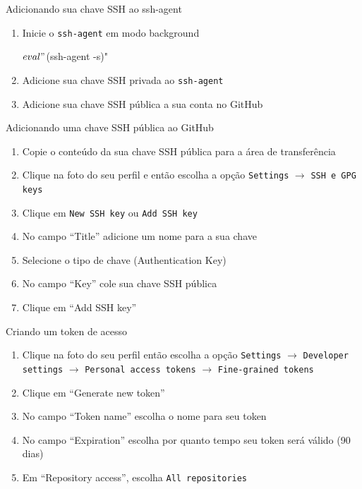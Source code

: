 \documentclass[aspectratio=169,14pt]{beamer}
\begin{document}
\begin{frame}[fragile]{Adicionando sua chave SSH ao ssh-agent}
    \begin{enumerate}
        \item Inicie o \texttt{ssh-agent} em modo background
        \begin{bashcode}
            $ eval "$(ssh-agent -s)"
        \end{bashcode}
        \item Adicione sua chave SSH privada ao \texttt{ssh-agent}
        \item Adicione sua chave SSH pública a sua conta no GitHub
    \end{enumerate}
\end{frame}

\begin{frame}{Adicionando uma chave SSH pública ao GitHub}
    \begin{enumerate}
        \item Copie o conteúdo da sua chave SSH pública para a área de
        transferência
        \item Clique na foto do seu perfil e então escolha a opção
        \texttt{Settings} $\rightarrow$ \texttt{SSH e GPG keys}
        \item Clique em \texttt{New SSH key} ou \texttt{Add SSH key}
        \item No campo ``Title'' adicione um nome para a sua chave
        \item Selecione o tipo de chave (Authentication Key)
        \item No campo ``Key'' cole sua chave SSH pública
        \item Clique em ``Add SSH key''
    \end{enumerate}
\end{frame}

\begin{frame}{Criando um token de acesso}
    \begin{enumerate}
        \item Clique na foto do seu perfil então escolha a opção
        \texttt{Settings} $\rightarrow$ \texttt{Developer settings}
        $\rightarrow$ \texttt{Personal access tokens} $\rightarrow$
        \texttt{Fine-grained tokens}
        \item Clique em ``Generate new token''
        \item No campo ``Token name'' escolha o nome para seu token
        \item No campo ``Expiration'' escolha por quanto tempo seu token será
        válido (90 dias)
        \item Em ``Repository access'', escolha \texttt{All repositories}
    \end{enumerate}
\end{frame}
\end{document}
